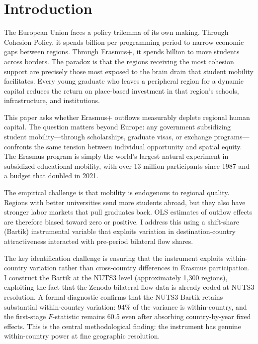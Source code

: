 \documentclass[12pt]{article}
\begin{document}
\section{Introduction}
\label{sec:introduction}

The European Union faces a policy trilemma of its own making. Through Cohesion Policy, it spends  billion per programming period to narrow economic gaps between regions. Through Erasmus+, it spends  billion to move students across borders. The paradox is that the regions receiving the most cohesion support are precisely those most exposed to the brain drain that student mobility facilitates. Every young graduate who leaves a peripheral region for a dynamic capital reduces the return on place-based investment in that region's schools, infrastructure, and institutions.

This paper asks whether Erasmus+ outflows measurably deplete regional human capital. The question matters beyond Europe: any government subsidizing student mobility---through scholarships, graduate visas, or exchange programs---confronts the same tension between individual opportunity and spatial equity. The Erasmus program is simply the world's largest natural experiment in subsidized educational mobility, with over 13 million participants since 1987 and a budget that doubled in 2021.

The empirical challenge is that mobility is endogenous to regional quality. Regions with better universities send more students abroad, but they also have stronger labor markets that pull graduates back. OLS estimates of outflow effects are therefore biased toward zero or positive. I address this using a shift-share (Bartik) instrumental variable \citep{borusyak_hull_jaravel_2022} that exploits variation in destination-country attractiveness interacted with pre-period bilateral flow shares.

The key identification challenge is ensuring that the instrument exploits within-country variation rather than cross-country differences in Erasmus participation. I construct the Bartik at the NUTS3 level (approximately 1,300 regions), exploiting the fact that the Zenodo bilateral flow data is already coded at NUTS3 resolution. A formal diagnostic confirms that the NUTS3 Bartik retains substantial within-country variation: 94\% of the variance is within-country, and the first-stage $F$-statistic remains 60.5 even after absorbing country-by-year fixed effects. This is the central methodological finding: the instrument has genuine within-country power at fine geographic resolution.
\end{document}
